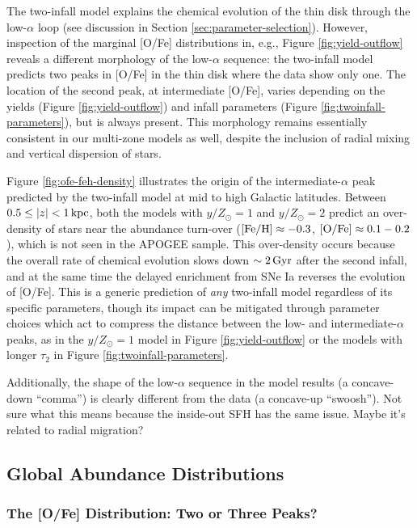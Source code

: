 \documentclass[twocolumn,twocolappendix,linenumbers]{aastex631}
\newcommand{\todo}[1]{{\color{red}#1}}
\newcommand{\mathFeH}{{\rm [Fe/H]}}
\newcommand{\mathOFe}{{\rm [O/Fe]}}
\newcommand{\kpc}{\,{\rm kpc}}
\begin{document}
The two-infall model explains the chemical evolution of the thin disk through the low-$\alpha$ loop (see discussion in Section \ref{sec:parameter-selection}). However, inspection of the marginal [O/Fe] distributions in, e.g., Figure \ref{fig:yield-outflow} reveals a different morphology of the low-$\alpha$ sequence: the two-infall model predicts two peaks in [O/Fe] in the thin disk where the data show only one. The location of the second peak, at intermediate [O/Fe], varies depending on the yields (Figure \ref{fig:yield-outflow}) and infall parameters (Figure \ref{fig:twoinfall-parameters}), but is always present. This morphology remains essentially consistent in our multi-zone models as well, despite the inclusion of radial mixing and vertical dispersion of stars.

Figure \ref{fig:ofe-feh-density} illustrates the origin of the intermediate-$\alpha$ peak predicted by the two-infall model at mid to high Galactic latitudes. Between $0.5\leq|z|<1\kpc$, both the models with $y/Z_\odot=1$ and $y/Z_\odot=2$ predict an over-density of stars near the abundance turn-over ($\mathFeH\approx-0.3$, $\mathOFe\approx0.1-0.2$), which is not seen in the APOGEE sample. This over-density occurs because the overall rate of chemical evolution slows down $\sim2\,{\rm Gyr}$ after the second infall, and at the same time the delayed enrichment from SNe Ia reverses the evolution of [O/Fe]. This is a generic prediction of {\it any} two-infall model regardless of its specific parameters, though its impact can be mitigated through parameter choices which act to compress the distance between the low- and intermediate-$\alpha$ peaks, as in the $y/Z_\odot=1$ model in Figure \ref{fig:yield-outflow} or the models with longer $\tau_2$ in Figure \ref{fig:twoinfall-parameters}.

Additionally, the shape of the low-$\alpha$ sequence in the model results (a concave-down ``comma'') is clearly different from the data (a concave-up ``swoosh''). \todo{Not sure what this means because the inside-out SFH has the same issue. Maybe it's related to radial migration?}

\subsection{Global Abundance Distributions}
\label{sec:disk-abundances}

\subsubsection{The [O/Fe] Distribution: Two or Three Peaks?}
\end{document}
